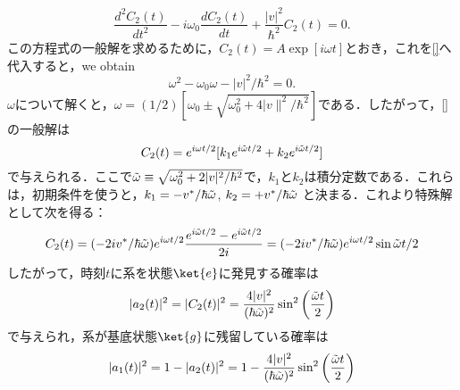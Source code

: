 \begin{equation}
    \frac{d^2C_2(t)}{dt^2}-i\omega_0\frac{dC_2(t)}{dt}+\frac{|v|^2}{\hbar^2}C_2(t)=0.
\end{equation}
この方程式の一般解を求めるために，$C_2(t)=A\exp[i\omega t]$とおき，これを\eqref{}へ代入すると，we obtain
\begin{equation}
    \omega^2-\omega_0\omega-|v|^2/\hbar^2=0.
\end{equation}
$\omega$について解くと，$\omega=(1/2)[\omega_0\pm\sqrt{\omega_0^2+4|v\|^2/\hbar^2}]$である．したがって，\eqref{}の一般解は
\begin{equation}
    C_2(t)=e^{i\omega t/2}[k_1e^{i\Tilde{\omega} t/2}+k_2e^{i\Tilde{\omega} t/2}]
\end{equation}
で与えられる．ここで$\Tilde{\omega}\equiv\sqrt{\omega_0^2+2|v|^2/\hbar^2}$で，$k_1$と$k_2$は積分定数である．これらは，初期条件を使うと，$k_1=-v^{\ast}/\hbar\Tilde{\omega}$, $k_2=+v^{\ast}/\hbar\Tilde{\omega}$
と決まる．これより特殊解として次を得る：
\begin{equation}
    C_2(t)=(-2iv^{\ast}/\hbar\Tilde{\omega})e^{i\omega t/2}\frac{e^{i\Tilde{\omega} t/2}-e^{i\Tilde{\omega} t/2}}{2i}
    =(-2iv^{\ast}/\hbar\Tilde{\omega})e^{i\omega t/2}\sin{\Tilde{\omega}t/2}
\end{equation}
したがって，時刻$t$に系を状態$\ket{e}$に発見する確率は
\begin{equation}
    |a_2(t)|^2=|C_2(t)|^2
    =\frac{4|v|^2}{(\hbar\Tilde{\omega})^2}\sin^2{\left(\frac{\Tilde{\omega}t}{2}\right)}
\end{equation}
で与えられ，系が基底状態$\ket{g}$に残留している確率は
\begin{equation}
    |a_1(t)|^2=1-|a_2(t)|^2=1-\frac{4|v|^2}{(\hbar\Tilde{\omega})^2}\sin^2{\left(\frac{\Tilde{\omega}t}{2}\right)}
\end{equation}
